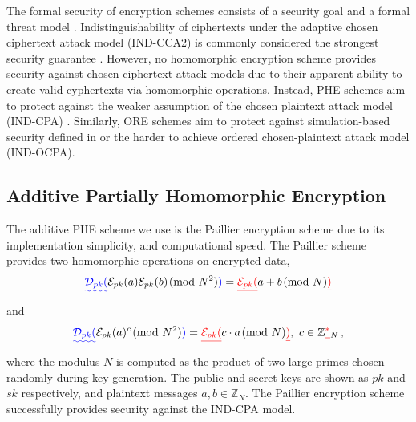 \documentclass[letterpaper, 10 pt, conference]{ieeeconf}  %
\providecommand{\DIFadd}[1]{{\protect\color{blue}\uwave{#1}}} %
\providecommand{\DIFdel}[1]{{\protect\color{red}\sout{#1}}}                      %
\providecommand{\DIFaddbegin}{} %
\providecommand{\DIFaddend}{} %
\providecommand{\DIFdelbegin}{} %
\providecommand{\DIFdelend}{} %
\begin{document}
The formal security of encryption schemes consists of a security goal and a formal threat model \cite{katzIntroductionModernCryptography2008}. Indistinguishability of ciphertexts under the adaptive chosen ciphertext attack model (IND-CCA2) is commonly considered the strongest security guarantee \cite{bellareRelationsNotionsSecurity1998}. However, no homomorphic encryption scheme provides security against chosen ciphertext attack models due to their apparent ability to create valid cyphertexts via homomorphic operations. Instead, PHE schemes aim to protect against the weaker assumption of the chosen plaintext attack model (IND-CPA) \cite{chaseSecurityHomomorphicEncryption2017}. Similarly, ORE schemes aim to protect against simulation-based security defined in \cite{chenettePracticalOrderRevealingEncryption2016} or the harder to achieve ordered chosen-plaintext attack model (IND-OCPA).

\subsection{Additive Partially Homomorphic Encryption} \label{subsec:paillier}
The additive PHE scheme we use is the Paillier encryption scheme \cite{paillierPublicKeyCryptosystemsBased1999} due to its implementation simplicity, and computational speed. The Paillier scheme provides two homomorphic operations on encrypted data, 
\begin{equation}
   \DIFaddbegin \DIFadd{\mathcal{D}_{pk}(}\DIFaddend \mathcal{E}_{pk}(a)\mathcal{E}_{pk}(b) \!\!\pmod{N^{2}}\DIFaddbegin \DIFadd{) }\DIFaddend = \DIFdelbegin \DIFdel{\mathcal{E}_{pk}(}\DIFdelend a + b \!\!\pmod{N} \DIFdelbegin \DIFdel{) }\DIFdelend \label{eqn:paillier_add}
\end{equation}
and
\begin{equation}
   \DIFaddbegin \DIFadd{\mathcal{D}_{pk}(}\DIFaddend \mathcal{E}_{pk}(a)^c \!\!\pmod{N^{2}}\DIFaddbegin \DIFadd{) }\DIFaddend = \DIFdelbegin \DIFdel{\mathcal{E}_{pk}(}\DIFdelend c\cdot a \!\!\pmod{N}\DIFdelbegin \DIFdel{)}\DIFdelend ,\ c \in \mathbb{Z}\DIFdelbegin \DIFdel{^*}\DIFdelend _N\,, \label{eqn:paillier_mult}
\end{equation}
where the modulus $N$ is computed as the product of two large primes chosen randomly during key-generation. The public and secret keys are shown as $pk$ and $sk$ respectively, and plaintext messages $a,b \in \mathbb{Z}_N$. The Paillier encryption scheme successfully provides security against the IND-CPA model.
\end{document}
